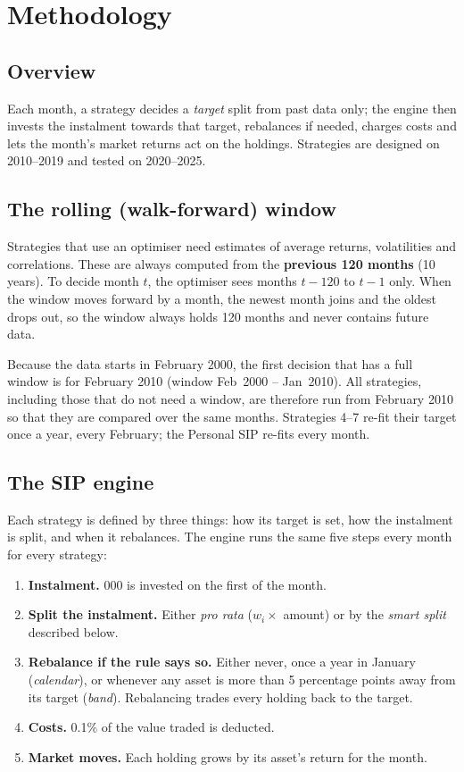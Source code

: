 \section{Methodology}
\label{ch:method}

\subsection{Overview}

Each month, a strategy decides a \emph{target} split from past data only; the engine then invests the instalment towards that target, rebalances if needed, charges costs and lets the month's market returns act on the holdings. Strategies are designed on 2010--2019 and tested on 2020--2025.

\subsection{The rolling (walk-forward) window}
\label{sec:window}

Strategies that use an optimiser need estimates of average returns, volatilities and correlations.
These are always computed from the \textbf{previous 120 months} (10 years). To decide month $t$, the
optimiser sees months $t-120$ to $t-1$ only. When the window moves forward by a month, the newest
month joins and the oldest drops out, so the window always holds 120 months and never contains
future data.

Because the data starts in February 2000, the first decision that has a full window is for
February 2010 (window Feb~2000 -- Jan~2010). All strategies, including those that do not need a
window, are therefore run from February 2010 so that they are compared over the same months.
Strategies 4--7 re-fit their target once a year, every February; the Personal SIP re-fits every
month.

\subsection{The SIP engine}
\label{sec:engine}

Each strategy is defined by three things: how its target is set, how the instalment is split, and
when it rebalances. The engine runs the same five steps every month for every strategy:

\begin{enumerate}
  \item \textbf{Instalment.} 000 is invested on the first of the month.
  \item \textbf{Split the instalment.} Either \emph{pro rata} ($w_i \times$ amount) or by the
        \emph{smart split} described below.
  \item \textbf{Rebalance if the rule says so.} Either never, once a year in January
        (\emph{calendar}), or whenever any asset is more than 5 percentage points away from its
        target (\emph{band}). Rebalancing trades every holding back to the target.
  \item \textbf{Costs.} 0.1\% of the value traded is deducted.
  \item \textbf{Market moves.} Each holding grows by its asset's return for the month.
\end{enumerate}

